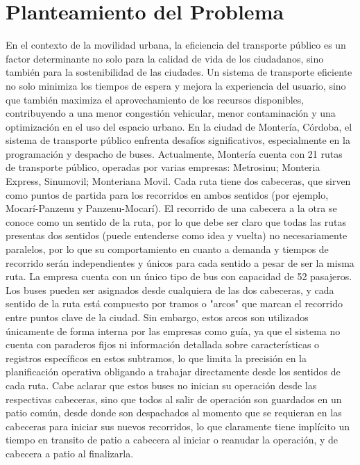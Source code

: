 \documentclass[preprint,11pt]{elsarticle}
\begin{document}
\section{Planteamiento del Problema}

En el contexto de la movilidad urbana, la eficiencia del transporte público es un factor determinante no solo para la calidad de vida de los ciudadanos, sino también para la sostenibilidad de las ciudades. Un sistema de transporte eficiente no solo minimiza los tiempos de espera y mejora la experiencia del usuario, sino que también maximiza el aprovechamiento de los recursos disponibles, contribuyendo a una menor congestión vehicular, menor contaminación y una optimización en el uso del espacio urbano.
En la ciudad de Montería, Córdoba, el sistema de transporte público enfrenta desafíos significativos, especialmente en la programación y despacho de buses. Actualmente, Montería cuenta con 21 rutas de transporte público, operadas por varias empresas: Metrosinu; Monteria Express, Sinumovil; Monteriana Movil. Cada ruta tiene dos cabeceras, que sirven como puntos de partida para los recorridos en ambos sentidos (por ejemplo, Mocarí-Panzenu y Panzenu-Mocarí). El recorrido de una cabecera a la otra se conoce como un sentido de la ruta, por lo que debe ser claro que todas las rutas presentas dos sentidos (puede entenderse como idea y vuelta) no necesariamente paralelos, por lo que su comportamiento en cuanto a demanda y tiempos de recorrido serán independientes y únicos para cada sentido a pesar de ser la misma ruta. 
La empresa cuenta con un único tipo de bus con capacidad de 52 pasajeros. Los buses pueden ser asignados desde cualquiera de las dos cabeceras, y cada sentido de la ruta está compuesto por tramos o "arcos" que marcan el recorrido entre puntos clave de la ciudad. Sin embargo, estos arcos son utilizados únicamente de forma interna por las empresas como guía, ya que el sistema no cuenta con paraderos fijos ni información detallada sobre características o registros específicos en estos subtramos, lo que limita la precisión en la planificación operativa obligando a trabajar directamente desde los sentidos de cada ruta. Cabe aclarar que estos buses no inician su operación desde las respectivas cabeceras, sino que todos al salir de operación son guardados en un patio común, desde donde son despachados al momento que se requieran en las cabeceras para iniciar sus nuevos recorridos, lo que claramente tiene implícito un tiempo en transito de patio a cabecera al iniciar o reanudar la operación, y de cabecera a patio al finalizarla.
\end{document}
